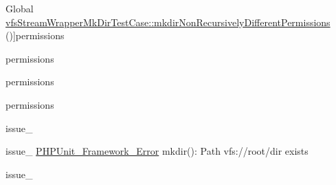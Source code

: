 \begin{DoxyRefList}
%
Global \mbox{\hyperlink{classorg_1_1bovigo_1_1vfs_1_1vfs_stream_wrapper_mk_dir_test_case_a0f791364308bfc16126fb0913fd917e2}{vfs\+Stream\+Wrapper\+Mk\+Dir\+Test\+Case\+:\+:mkdir\+Non\+Recursively\+Different\+Permissions}} ()]permissions  
\item[\label{test__test000139}%
\Hypertarget{test__test000139}%
Global \mbox{\hyperlink{classorg_1_1bovigo_1_1vfs_1_1vfs_stream_wrapper_mk_dir_test_case_a65e6c6241ad1b790f552b5e5e78061b9}{vfs\+Stream\+Wrapper\+Mk\+Dir\+Test\+Case\+:\+:mkdir\+On\+File\+Returns\+False}} ()]
\item[\label{test__test000136}%
\Hypertarget{test__test000136}%
Global \mbox{\hyperlink{classorg_1_1bovigo_1_1vfs_1_1vfs_stream_wrapper_mk_dir_test_case_aae14c6d5af61495c3146496273a27914}{vfs\+Stream\+Wrapper\+Mk\+Dir\+Test\+Case\+:\+:mkdir\+Recursively}} ()]permissions  
\item[\label{test__test000141}%
\Hypertarget{test__test000141}%
Global \mbox{\hyperlink{classorg_1_1bovigo_1_1vfs_1_1vfs_stream_wrapper_mk_dir_test_case_a523c3194f3b232d82414e620e858cb3d}{vfs\+Stream\+Wrapper\+Mk\+Dir\+Test\+Case\+:\+:mkdir\+Recursively\+Different\+Permissions}} ()]permissions  
\item[\label{test__test000142}%
\Hypertarget{test__test000142}%
Global \mbox{\hyperlink{classorg_1_1bovigo_1_1vfs_1_1vfs_stream_wrapper_mk_dir_test_case_ac7affcd82d4f6e10711bb17db3107b5d}{vfs\+Stream\+Wrapper\+Mk\+Dir\+Test\+Case\+:\+:mkdir\+Recursively\+Uses\+Default\+Permissions}} ()]permissions  
\item[\label{test__test000146}%
\Hypertarget{test__test000146}%
Global \mbox{\hyperlink{classorg_1_1bovigo_1_1vfs_1_1vfs_stream_wrapper_mk_dir_test_case_a4c7781857de68e8ed8a35669159656ac}{vfs\+Stream\+Wrapper\+Mk\+Dir\+Test\+Case\+:\+:mk\+Dir\+Should\+Not\+Overwrite\+Existing\+Directories}} ()]issue\+\_  
\item[\label{test__test000147}%
\Hypertarget{test__test000147}%
Global \mbox{\hyperlink{classorg_1_1bovigo_1_1vfs_1_1vfs_stream_wrapper_mk_dir_test_case_a72e64203a108af87fb2928e6d7676166}{vfs\+Stream\+Wrapper\+Mk\+Dir\+Test\+Case\+:\+:mk\+Dir\+Should\+Not\+Overwrite\+Existing\+Directories\+And\+Trigger\+E\+\_\+\+U\+S\+E\+R\+\_\+\+W\+A\+R\+N\+I\+NG}} ()]issue\+\_  \mbox{\hyperlink{class_p_h_p_unit___framework___error}{P\+H\+P\+Unit\+\_\+\+Framework\+\_\+\+Error}}  mkdir()\+: Path vfs\+://root/dir exists  
\item[\label{test__test000148}%
\Hypertarget{test__test000148}%
Global \mbox{\hyperlink{classorg_1_1bovigo_1_1vfs_1_1vfs_stream_wrapper_mk_dir_test_case_a2af02d877af008a9ce11a97016fc7759}{vfs\+Stream\+Wrapper\+Mk\+Dir\+Test\+Case\+:\+:mk\+Dir\+Should\+Not\+Overwrite\+Existing\+Files}} ()]issue\+\_  

\end{DoxyRefList}

